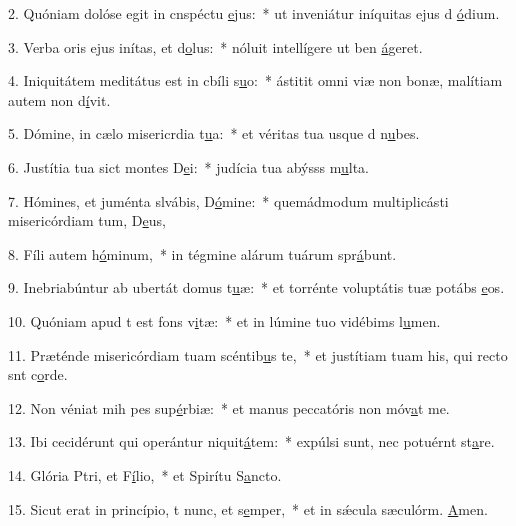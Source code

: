 2. Quóniam dolóse egit in cnspéctu \uline{e}jus:~* ut inveniátur iníquitas ejus d \uline{ó}dium.\par 
3. Verba oris ejus inítas, et d\uline{o}lus:~* nóluit intellígere ut ben \uline{á}geret.\par 
4. Iniquitátem meditátus est in cbíli s\uline{u}o:~* ástitit omni viæ non bonæ, malítiam autem non d\uline{í}vit.\par 
5. Dómine, in cælo misericrdia t\uline{u}a:~* et véritas tua usque d n\uline{u}bes.\par 
6. Justítia tua sict montes D\uline{e}i:~* judícia tua abýsss m\uline{u}lta.\par 
7. Hómines, et juménta slvábis, D\uline{ó}mine:~* quemádmodum multiplicásti misericórdiam tum, D\uline{e}us,\par 
8. Fíli autem h\uline{ó}minum,~* in tégmine alárum tuárum spr\uline{á}bunt.\par 
9. Inebriabúntur ab ubertát domus t\uline{u}æ:~* et torrénte voluptátis tuæ potábs \uline{e}os.\par 
10. Quóniam apud t est fons v\uline{i}tæ:~* et in lúmine tuo vidébims l\uline{u}men.\par 
11. Præténde misericórdiam tuam scéntib\uline{u}s te,~* et justítiam tuam his, qui recto snt c\uline{o}rde.\par 
12. Non véniat mih pes sup\uline{é}rbiæ:~* et manus peccatóris non móv\uline{a}t me.\par 
13. Ibi cecidérunt qui operántur niquit\uline{á}tem:~* expúlsi sunt, nec potuérnt st\uline{a}re.\par 
14. Glória Ptri, et F\uline{í}lio,~* et Spirítu S\uline{a}ncto.\par 
15. Sicut erat in princípio, t nunc, et s\uline{e}mper,~* et in sǽcula sæculórm. \uline{A}men.\par 
